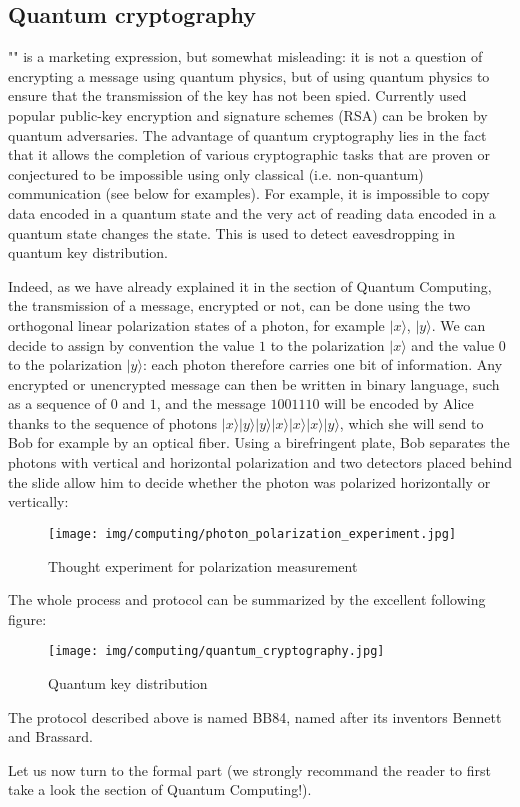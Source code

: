 	\pagebreak
	\subsection{Quantum cryptography}
	"" is a marketing expression, but somewhat misleading: it is not a question of encrypting a message using quantum physics, but of using quantum physics to ensure that the transmission of the key has not been spied. Currently used popular public-key encryption and signature schemes (RSA) can be broken by quantum adversaries. The advantage of quantum cryptography lies in the fact that it allows the completion of various cryptographic tasks that are proven or conjectured to be impossible using only classical (i.e. non-quantum) communication (see below for examples). For example, it is impossible to copy data encoded in a quantum state and the very act of reading data encoded in a quantum state changes the state. This is used to detect eavesdropping in quantum key distribution.

	Indeed, as we have already explained it in the section of Quantum Computing, the transmission of a message, encrypted or not, can be done using the two orthogonal linear polarization states of a photon, for example $|x\rangle$, $|y\rangle$. We can decide to assign by convention the value $1$ to the polarization $|x\rangle$ and the value $0$ to the polarization $|y\rangle$: each photon therefore carries one bit of information. Any encrypted or unencrypted message can then be written in binary language, such as a sequence of $0$ and $1$, and the message $1001110$ will be encoded by Alice thanks to the sequence of photons $|x\rangle |y\rangle |y\rangle |x\rangle |x\rangle |x\rangle |y\rangle$, which she will send to Bob for example by an optical fiber. Using a birefringent plate, Bob separates the photons with vertical and horizontal polarization and two detectors placed behind the slide allow him to decide whether the photon was polarized horizontally or vertically:
	\begin{figure}[H]
		\centering
		\texttt{[image: img/computing/photon\_polarization\_experiment.jpg]}
		\caption{Thought experiment for polarization measurement}
	\end{figure}
	
	The whole process and protocol can be summarized by the excellent following figure:
	\begin{figure}[H]
		\centering
		\texttt{[image: img/computing/quantum\_cryptography.jpg]}
		\caption{Quantum key distribution}
	\end{figure}
	\begin{tcolorbox}[title=Remark,colframe=black,arc=10pt]
	The protocol described above is named BB84, named after its inventors Bennett and Brassard.
	\end{tcolorbox}
	Let us now turn to the formal part (we strongly recommand the reader to first take a look the section of Quantum Computing!).


